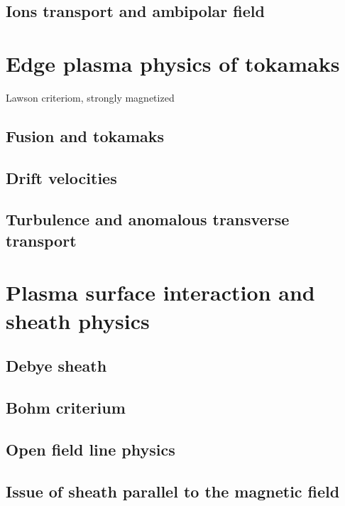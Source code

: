 		\subsection{Ions transport and ambipolar field}
	\section{Edge plasma physics of tokamaks}
		Lawson criteriom, strongly magnetized
		\subsection{Fusion and tokamaks}
		\subsection{Drift velocities}
		\subsection{Turbulence and anomalous transverse transport}
	\section{Plasma surface interaction and sheath physics}
		\subsection{Debye sheath}
		\subsection{Bohm criterium}
		\subsection{Open field line physics}
		\subsection{Issue of sheath parallel to the magnetic field}

		